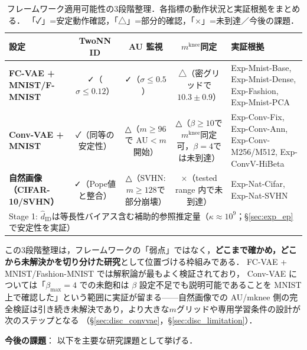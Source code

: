 \documentclass[11pt,a4paper]{jsarticle}
\newcommand{\kap}{\kappa}
\newcommand{\mknee}{m^{\mathrm{knee}}}
\begin{document}
\begin{table}[H]
\centering
\caption{フレームワーク適用可能性の3段階整理．各指標の動作状況と実証根拠をまとめる．
「✓」=安定動作確認，「△」=部分的確認，「×」=未到達／今後の課題．}
\label{tab:applicability_tier}
\small
\begin{tabular}{lcccp{3.8cm}}
\toprule
設定 & TwoNN ID & AU 監視 & $\mknee$同定 & 実証根拠 \\
\midrule
\textbf{FC-VAE + MNIST/F-MNIST}
  & ✓（$\sigma\leq0.12$）
  & ✓（$\sigma\leq0.5$）
  & △（密グリッドで$10.3\pm0.9$）
  & Exp-Mnist-Base, Exp-Mnist-Dense, Exp-Fashion, Exp-Mnist-PCA \\
\addlinespace
\textbf{Conv-VAE + MNIST}
  & ✓（同等の安定性）
  & △（$m\geq96$で AU$<m$開始）
  & △（$\beta\geq10$で$\mknee$同定可，$\beta=4$では未到達）
  & Exp-Conv-Fix, Exp-Conv-Ann, Exp-Conv-M256/M512, Exp-ConvV-HiBeta \\
\addlinespace
\textbf{自然画像（CIFAR-10/SVHN）}
  & ✓（Pope値と整合）
  & △（SVHN: $m\geq128$で部分崩壊）
  & ×（tested range 内で未到達）
  & Exp-Nat-Cifar, Exp-Nat-SVHN \\
\midrule
\multicolumn{5}{l}{\small Stage 1: $\hat{d}_\mathrm{ID}$は等長性バイアス含む補助的参照推定量（$\kap\approx10^9$；§\ref{sec:exp_ep}で安定性を実証）}\\
\bottomrule
\end{tabular}
\end{table}

この3段階整理は，フレームワークの「弱点」ではなく，\textbf{どこまで確かめ，どこから未解決かを切り分けた研究}として位置づける枠組みである．
FC-VAE + MNIST/Fashion-MNIST では解釈論が最もよく検証されており，
Conv-VAE については「$\beta_{\max}=4$ での未飽和は $\beta$ 設定不足でも説明可能であることを MNIST 上で確認した」という範囲に実証が留まる——自然画像での AU/mknee 側の完全検証は引き続き未解決であり，より大きな$m$グリッドや専用学習条件の設計が次のステップとなる
（§\ref{sec:disc_convvae}，§\ref{sec:disc_limitation}）．

\textbf{今後の課題}：
以下を主要な研究課題として挙げる．
\end{document}
